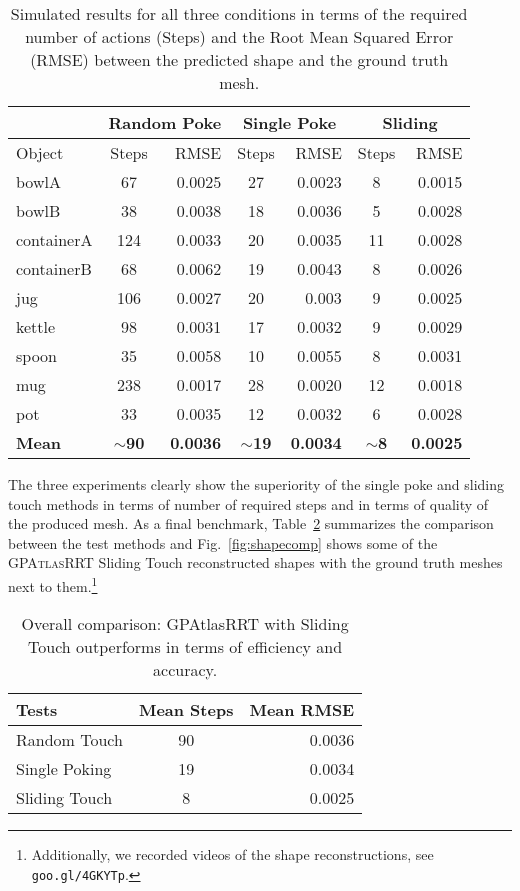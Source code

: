 \begin{table}
    \centering
    \begin{tabular}{|l|c|r|c|r|c|r|} \hline
        & \multicolumn{2}{|c|}{Random Poke} & \multicolumn{2}{c|}{Single Poke} & \multicolumn{2}{c|}{Sliding}\\
        \hline
        Object & Steps & RMSE & Steps & RMSE & Steps & RMSE\\
        \hline
        bowlA & 67 & 0.0025 & 27 & 0.0023 &8 & 0.0015\\
        bowlB & 38 & 0.0038 &18 & 0.0036 & 5 & 0.0028\\
        containerA & 124 & 0.0033 & 20 & 0.0035 & 11 & 0.0028\\
        containerB & 68 & 0.0062 & 19 & 0.0043 & 8 & 0.0026\\
        jug & 106 & 0.0027 & 20 & 0.003 & 9 & 0.0025\\
        kettle & 98 & 0.0031 & 17 & 0.0032 & 9 & 0.0029\\
        spoon & 35 & 0.0058 & 10 & 0.0055 & 8 & 0.0031\\
        mug & 238 & 0.0017 & 28 & 0.0020 & 12 & 0.0018\\
        pot & 33 & 0.0035 & 12 & 0.0032 & 6 & 0.0028\\
        \hline
        \textbf{Mean} & $\sim$\textbf{90} & \textbf{0.0036} & $\sim$\textbf{19} & \textbf{0.0034} & $\sim$\textbf{8} & \textbf{0.0025}\\
        \hline
    \end{tabular}
    \caption{Simulated results for all three conditions in terms of the required number of actions (Steps) and the Root Mean Squared Error (RMSE) between the predicted shape and the ground truth mesh.}
    \label{tab:tests}
\end{table}

The three experiments clearly show the superiority of the single poke and sliding touch methods in terms of number of required steps
and in terms of quality of the produced mesh. As a final benchmark, Table~\ref{tab:comp} summarizes the comparison
between the test methods and Fig.~\ref{fig:shapecomp} shows some  of the \textsc{GPAtlasRRT} Sliding Touch reconstructed shapes with
the ground truth meshes next to them.\footnote{Additionally, we recorded videos of the shape reconstructions, see \texttt{goo.gl/4GKYTp}.}
\begin{table}
    \centering
    \begin{tabular}{|l|c|r|}
        \hline
        Tests  & Mean Steps & Mean RMSE \\
        \hline
        Random Touch & 90 & 0.0036\\
        Single Poking &19 & 0.0034\\
        Sliding Touch &8 & 0.0025\\
        \hline
    \end{tabular}
    \caption{Overall comparison: GPAtlasRRT with Sliding Touch outperforms in terms
    of efficiency and accuracy.}
    \label{tab:comp}
\end{table}

